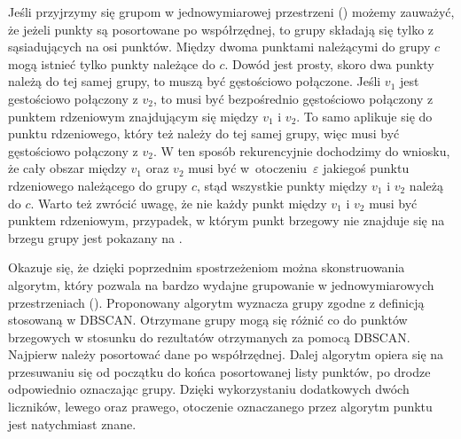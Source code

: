 

Jeśli przyjrzymy się grupom w jednowymiarowej przestrzeni () możemy zauważyć, że jeżeli punkty są posortowane po współrzędnej, to grupy składają się tylko z sąsiadujących na osi punktów. Między dwoma punktami należącymi do grupy $ c $ mogą istnieć tylko punkty należące do $ c $. Dowód jest prosty, skoro dwa punkty należą do tej samej grupy, to muszą być gęstościowo połączone. Jeśli $ v_1 $ jest gestościowo połączony z $ v_2 $, to musi być bezpośrednio gęstościowo połączony z punktem rdzeniowym znajdującym się między $ v_1 $ i $ v_2 $. To samo aplikuje się do punktu rdzeniowego, który też należy do tej samej grupy, więc musi być gęstościowo połączony z $ v_2 $. W ten sposób rekurencyjnie dochodzimy do wniosku, że cały obszar między $ v_1 $ oraz $ v_2 $ musi być \mbox{w otoczeniu $ \varepsilon $} jakiegoś punktu rdzeniowego należącego do grupy $ c $, stąd wszystkie punkty między $ v_1 $ i $ v_2 $ należą do $ c $. Warto też zwrócić uwagę, że nie każdy punkt między $ v_1 $ i $ v_2 $ musi być punktem rdzeniowym, przypadek, w którym punkt brzegowy nie znajduje się na brzegu grupy jest pokazany na .\par
Okazuje się, że dzięki poprzednim spostrzeżeniom można skonstruowania algorytm, który pozwala na bardzo wydajne grupowanie w jednowymiarowych przestrzeniach (). Proponowany algorytm wyznacza grupy zgodne z definicją stosowaną w DBSCAN. Otrzymane grupy mogą się różnić co do punktów brzegowych w stosunku do rezultatów otrzymanych za pomocą DBSCAN. Najpierw należy posortować dane po współrzędnej. Dalej algorytm opiera się na przesuwaniu się od początku do końca posortowanej listy punktów, po drodze odpowiednio oznaczając grupy. Dzięki wykorzystaniu dodatkowych dwóch liczników, lewego oraz prawego, otoczenie oznaczanego przez algorytm punktu jest natychmiast znane.\par



